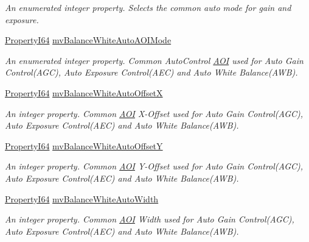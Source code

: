 \begin{DoxyCompactItemize}
\begin{DoxyCompactList}\small\item\em An enumerated integer property. Selects the common auto mode for gain and exposure. \end{DoxyCompactList}\item 
\hyperlink{group___common_interface_ga81749b2696755513663492664a18a893}{Property\+I64} \hyperlink{classmv_i_m_p_a_c_t_1_1acquire_1_1_gen_i_cam_1_1_analog_control_ac6e3d9808dbe4028dd44ed901c7664ae}{mv\+Balance\+White\+Auto\+A\+O\+I\+Mode}
\begin{DoxyCompactList}\small\item\em An enumerated integer property. Common Auto\+Control \hyperlink{struct_a_o_i}{A\+O\+I} used for Auto Gain Control(\+A\+G\+C), Auto Exposure Control(\+A\+E\+C) and Auto White Balance(\+A\+W\+B). \end{DoxyCompactList}\item 
\hyperlink{group___common_interface_ga81749b2696755513663492664a18a893}{Property\+I64} \hyperlink{classmv_i_m_p_a_c_t_1_1acquire_1_1_gen_i_cam_1_1_analog_control_a86d9c22a6cb1eb1d62374191e808b4e3}{mv\+Balance\+White\+Auto\+Offset\+X}
\begin{DoxyCompactList}\small\item\em An integer property. Common \hyperlink{struct_a_o_i}{A\+O\+I} X-\/\+Offset used for Auto Gain Control(\+A\+G\+C), Auto Exposure Control(\+A\+E\+C) and Auto White Balance(\+A\+W\+B). \end{DoxyCompactList}\item 
\hyperlink{group___common_interface_ga81749b2696755513663492664a18a893}{Property\+I64} \hyperlink{classmv_i_m_p_a_c_t_1_1acquire_1_1_gen_i_cam_1_1_analog_control_a0ff35c0603271ac43d1e26f1ffdfacef}{mv\+Balance\+White\+Auto\+Offset\+Y}
\begin{DoxyCompactList}\small\item\em An integer property. Common \hyperlink{struct_a_o_i}{A\+O\+I} Y-\/\+Offset used for Auto Gain Control(\+A\+G\+C), Auto Exposure Control(\+A\+E\+C) and Auto White Balance(\+A\+W\+B). \end{DoxyCompactList}\item 
\hyperlink{group___common_interface_ga81749b2696755513663492664a18a893}{Property\+I64} \hyperlink{classmv_i_m_p_a_c_t_1_1acquire_1_1_gen_i_cam_1_1_analog_control_a338eb6fc0ff578495472aca810623d24}{mv\+Balance\+White\+Auto\+Width}
\begin{DoxyCompactList}\small\item\em An integer property. Common \hyperlink{struct_a_o_i}{A\+O\+I} Width used for Auto Gain Control(\+A\+G\+C), Auto Exposure Control(\+A\+E\+C) and Auto White Balance(\+A\+W\+B). \end{DoxyCompactList}\item 

\end{DoxyCompactItemize}
